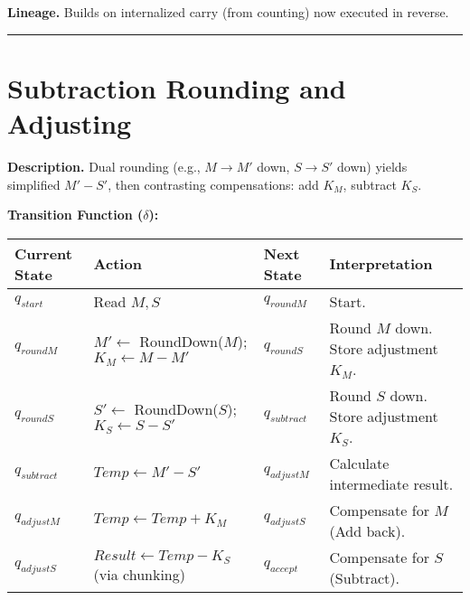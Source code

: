 \documentclass[
]{article}
\begin{document}
\textbf{Lineage.} Builds on internalized carry (from counting) now
executed in reverse.

\begin{center}\rule{0.5\linewidth}{0.5pt}\end{center}

\section{Subtraction Rounding and
Adjusting}\label{subtraction-rounding-and-adjusting}

\textbf{Description.} Dual rounding (e.g., \(M \to M'\) down,
\(S \to S'\) down) yields simplified \(M' - S'\), then contrasting
compensations: add \(K_M\), subtract \(K_S\).

\textbf{Transition Function (\(\delta\)):}

\begin{longtable}[]{@{}
  >{\raggedright\arraybackslash}p{}
  >{\raggedright\arraybackslash}p{}
  >{\raggedright\arraybackslash}p{}
  >{\raggedright\arraybackslash}p{}@{}}
\toprule\noalign{}
\begin{minipage}[b]{\linewidth}\raggedright
Current State
\end{minipage} & \begin{minipage}[b]{\linewidth}\raggedright
Action
\end{minipage} & \begin{minipage}[b]{\linewidth}\raggedright
Next State
\end{minipage} & \begin{minipage}[b]{\linewidth}\raggedright
Interpretation
\end{minipage} \\
\midrule\noalign{}
\endhead
\bottomrule\noalign{}
\endlastfoot
\(q_{start}\) & Read \(M, S\) & \(q_{roundM}\) & Start. \\
\(q_{roundM}\) & \(M' \leftarrow\) RoundDown(\(M\));
\(K_M \leftarrow M - M'\) & \(q_{roundS}\) & Round \(M\) down. Store
adjustment \(K_M\). \\
\(q_{roundS}\) & \(S' \leftarrow\) RoundDown(\(S\));
\(K_S \leftarrow S - S'\) & \(q_{subtract}\) & Round \(S\) down. Store
adjustment \(K_S\). \\
\(q_{subtract}\) & \(Temp \leftarrow M' - S'\) & \(q_{adjustM}\) &
Calculate intermediate result. \\
\(q_{adjustM}\) & \(Temp \leftarrow Temp + K_M\) & \(q_{adjustS}\) &
Compensate for \(M\) (Add back). \\
\(q_{adjustS}\) & \(Result \leftarrow Temp - K_S\) (via chunking) &
\(q_{accept}\) & Compensate for \(S\) (Subtract). \\
\end{longtable}
\end{document}
